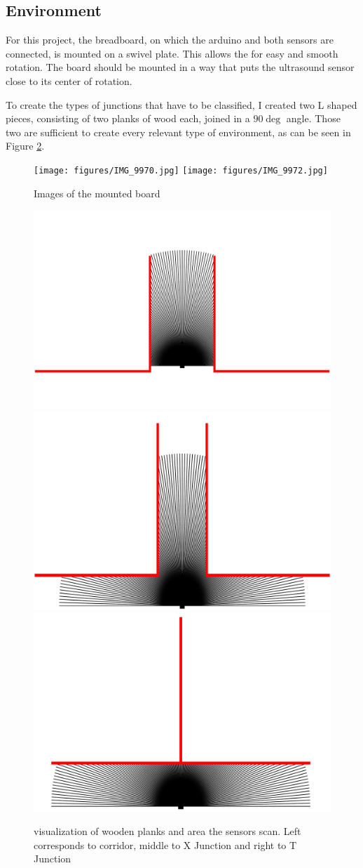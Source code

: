 \subsection{Environment}
\label{subsec:environment}

For this project, the breadboard, on which the arduino and both sensors are connected, is mounted on a swivel plate.
This allows the for easy and smooth rotation.
The board should be mounted in a way that puts the ultrasound sensor close to its center of rotation.

To create the types of junctions that have to be classified, I created two L shaped pieces, consisting of two planks of wood each, joined in a $90\deg$ angle.
Those two are sufficient to create every relevant type of environment, as can be seen in Figure \ref{fig:env}.

\begin{figure}
    \centering
    \texttt{[image: figures/IMG\_9970.jpg]}
    \texttt{[image: figures/IMG\_9972.jpg]}
    \caption{Images of the mounted board}

    \label{fig:setup}
\end{figure}


\begin{figure}
    \centering
    \includegraphics[width=0.3\linewidth]{figures/c.pdf}
    \includegraphics[width=0.3\linewidth]{figures/x.pdf}
    \includegraphics[width=0.3\linewidth]{figures/t.pdf}

    \caption{visualization of wooden planks and area the sensors scan.
        Left corresponds to corridor, middle to X Junction and right to T Junction}

    \label{fig:env}
\end{figure}